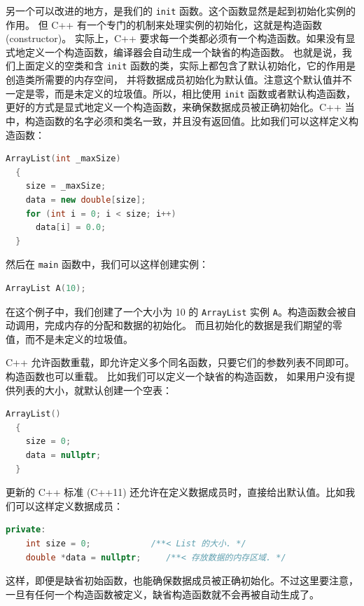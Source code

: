 \documentclass[a4paper]{ctexart}
\theoremstyle{definition}
\theoremstyle{definition}
\begin{document}
另一个可以改进的地方，是我们的 \verb|init| 函数。这个函数显然是起到初始化实例的作用。
但 C++ 有一个专门的机制来处理实例的初始化，这就是构造函数 (constructor)。
实际上，C++ 要求每一个类都必须有一个构造函数。如果没有显式地定义一个构造函数，编译器会自动生成一个缺省的构造函数。
也就是说，我们上面定义的空类和含 \verb|init| 函数的类，实际上都包含了默认初始化，它的作用是创造类所需要的内存空间，
并将数据成员初始化为默认值。注意这个默认值并不一定是零，而是未定义的垃圾值。所以，相比使用 \verb|init| 函数或者默认构造函数，
更好的方式是显式地定义一个构造函数，来确保数据成员被正确初始化。C++ 当中，构造函数的名字必须和类名一致，并且没有返回值。比如我们可以这样定义构造函数：
\begin{lstlisting}[language=C++]
  ArrayList(int _maxSize)
  {
    size = _maxSize;
    data = new double[size];
    for (int i = 0; i < size; i++)
      data[i] = 0.0;
  }
\end{lstlisting}
然后在 \verb|main| 函数中，我们可以这样创建实例：
\begin{lstlisting}[language=C++]
  ArrayList A(10);
\end{lstlisting}

在这个例子中，我们创建了一个大小为 10 的 \verb|ArrayList| 实例 \verb|A|。构造函数会被自动调用，完成内存的分配和数据的初始化。
而且初始化的数据是我们期望的零值，而不是未定义的垃圾值。

C++ 允许函数重载，即允许定义多个同名函数，只要它们的参数列表不同即可。构造函数也可以重载。 比如我们可以定义一个缺省的构造函数，
如果用户没有提供列表的大小，就默认创建一个空表：
\begin{lstlisting}[language=C++]
  ArrayList()
  {
    size = 0;
    data = nullptr;
  }
\end{lstlisting}

更新的 C++ 标准 (C++11) 还允许在定义数据成员时，直接给出默认值。比如我们可以这样定义数据成员：
\begin{lstlisting}[language=C++]
  private:
    int size = 0;            /**< List 的大小. */
    double *data = nullptr;     /**< 存放数据的内存区域. */
\end{lstlisting}
这样，即便是缺省初始函数，也能确保数据成员被正确初始化。不过这里要注意，一旦有任何一个构造函数被定义，缺省构造函数就不会再被自动生成了。
\end{document}
